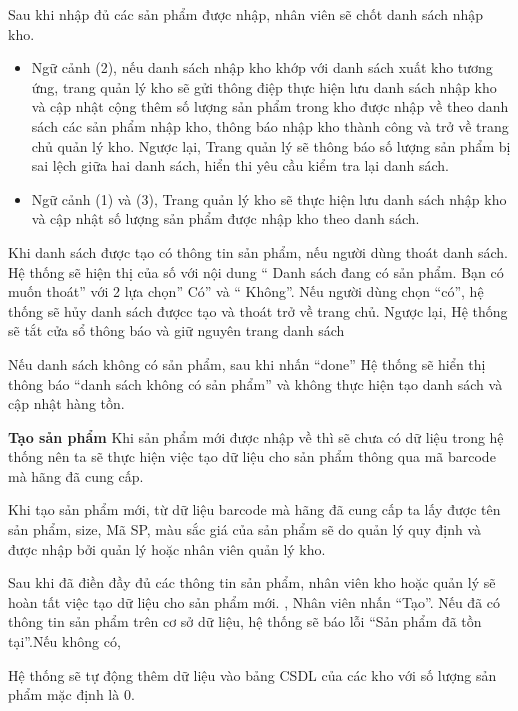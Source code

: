 \documentclass{article}
\begin{document}
Sau khi nhập đủ các sản phẩm được nhập, nhân viên sẽ chốt danh sách nhập kho.
\begin{itemize}
    \item Ngữ cảnh (2), nếu danh sách nhập kho khớp với danh sách xuất kho tương ứng, trang quản lý kho sẽ gửi thông điệp thực hiện lưu danh sách nhập kho và cập nhật cộng thêm số lượng sản phẩm trong kho được nhập về theo danh sách các sản phẩm nhập kho, thông báo nhập kho thành công và trở về trang chủ quản lý kho. Ngược lại, Trang quản lý sẽ thông báo số lượng sản phẩm bị sai lệch giữa hai danh sách, hiển thi yêu cầu kiểm tra lại danh sách. 
    \item Ngữ cảnh (1) và (3), Trang quản lý kho sẽ thực hiện lưu danh sách nhập kho và cập nhật số lượng sản phẩm được nhập kho theo danh sách.
\end{itemize}
Khi danh sách được tạo có thông tin sản phẩm, nếu người dùng thoát danh sách. Hệ thống sẽ hiện thị của số với nội dung “ Danh sách đang có sản phẩm. Bạn có muốn thoát” với 2 lựa chọn” Có” và “ Không”. Nếu người dùng chọn  “có”, hệ thống sẽ hủy danh sách đượcc tạo và thoát trở về trang chủ. Ngược lại, Hệ thống sẽ tắt cửa sổ thông báo và giữ nguyên trang danh sách

Nếu danh sách không có sản phẩm, sau khi nhấn “done” Hệ thống sẽ hiển thị thông báo “danh sách không có sản phẩm” và không thực hiện tạo danh sách và cập nhật hàng tồn.

\fontsize{14}{20}\selectfont\textbf{Tạo sản phẩm}
Khi sản phẩm mới được nhập về thì sẽ chưa có dữ liệu trong hệ thống nên ta  sẽ thực hiện việc tạo dữ liệu cho sản phẩm thông qua mã barcode mà hãng đã cung cấp.

Khi tạo sản phẩm mới, từ dữ liệu barcode mà hãng đã cung cấp ta lấy được tên sản phẩm, size, Mã SP, màu sắc giá của sản phẩm sẽ do quản lý quy định và được nhập bởi quản lý hoặc nhân viên quản lý kho. 

Sau khi đã điền đầy đủ các thông tin sản phẩm, nhân viên kho hoặc quản lý sẽ hoàn tất việc tạo dữ liệu cho sản phẩm mới. , Nhân viên nhấn “Tạo”. Nếu đã có thông tin sản phẩm trên cơ sở dữ liệu, hệ thống sẽ báo lỗi “Sản phẩm đã tồn tại”.Nếu không có,

Hệ thống sẽ tự động thêm dữ liệu vào bảng CSDL của các kho với số lượng sản phẩm mặc định là 0.
\end{document}
